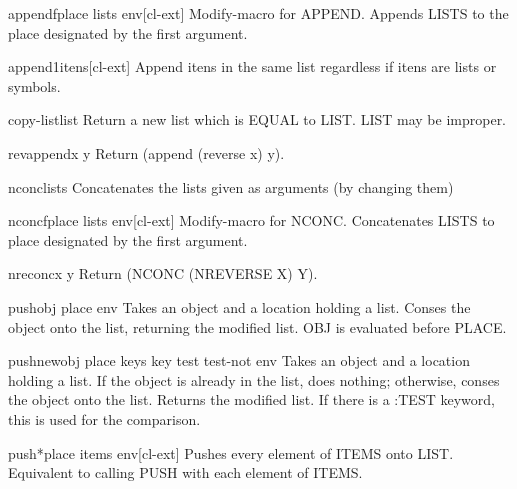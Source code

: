 \documentclass[10pt,english]{book}
\begin{document}
\begin{macro}{appendf}{place \rest lists \env env}[cl-ext]
  Modify-macro for APPEND. Appends LISTS to the place designated by the first
argument.
\end{macro}

\begin{function}{append1}{\rest itens}[cl-ext]
  Append itens in the same list regardless if itens are lists or
  symbols.
\end{function}

\begin{function}{copy-list}{list}
  Return a new list which is EQUAL to LIST. LIST may be improper.
\end{function}

\begin{function}{revappend}{x y}
  Return (append (reverse x) y).
\end{function}

\begin{function}{nconc}{\rest lists}
  Concatenates the lists given as arguments (by changing them)
\end{function}

\begin{macro}{nconcf}{place \rest lists \env env}[cl-ext]
  Modify-macro for NCONC. Concatenates LISTS to place designated by the first
argument.
\end{macro}

\begin{function}{nreconc}{x y}
  Return (NCONC (NREVERSE X) Y).
\end{function}

\begin{macro}{push}{obj place \env env}
  Takes an object and a location holding a list. Conses the object onto
  the list, returning the modified list. OBJ is evaluated before PLACE.
\end{macro}

\begin{macro}{pushnew}{obj place \rest keys \key key test test-not \env env}
  Takes an object and a location holding a list. If the object is
  already in the list, does nothing; otherwise, conses the object onto
  the list. Returns the modified list. If there is a :TEST keyword, this
  is used for the comparison.
\end{macro}

\begin{macro}{push*}{place \rest items \env env}[cl-ext]
  Pushes every element of ITEMS onto LIST. Equivalent to calling PUSH
  with each element of ITEMS.
\end{macro}
\end{document}
